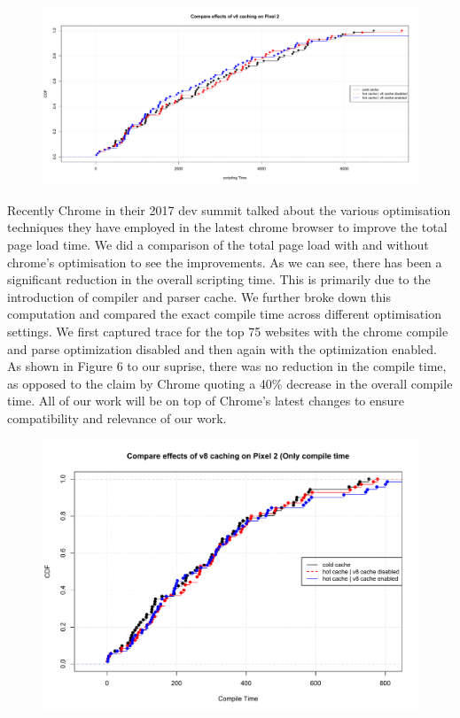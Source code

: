 \begin{figure}[t]
\centering
\includegraphics[width=0.9\columnwidth]{figs/v8cache_P2_scripting.pdf}
\label{fig:scripting_p2}
\end{figure}

Recently Chrome in their 2017 dev summit talked about the various optimisation techniques
they have employed in the latest chrome browser to improve the total page load time.
We did a comparison of the total page load with and without chrome's optimisation to see
the improvements. As we can see, there has been a significant reduction in the overall scripting
time. This is primarily due to the introduction of compiler and parser cache. 
We further broke down this computation and compared the exact compile time across different 
optimisation settings. We first captured trace for the top 75 websites with the chrome compile
and parse optimization disabled and then again with the optimization enabled. As shown in Figure 6
to our suprise, there was no reduction in the compile time, as opposed to the claim by Chrome
quoting a 40\% decrease in the overall compile time.  
All of our work will be on top of Chrome's latest changes to ensure compatibility and relevance
of our work. 

\begin{figure}[t]
\centering
\includegraphics[width=0.9\columnwidth]{figs/v8cache_P2_compile.pdf}
\label{fig:compile_p2}
\end{figure}

